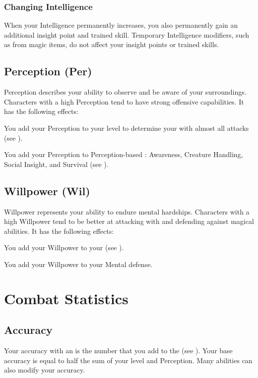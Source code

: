     \subsubsection{Changing Intelligence}\label{Changing Intelligence}
      When your Intelligence permanently increases, you also permanently gain an additional insight point and trained skill.
      Temporary Intelligence modifiers, such as from magic items, do not affect your insight points or trained skills.

  \subsection{Perception (Per)}\label{Perception}
    {
      Perception describes your ability to observe and be aware of your surroundings.
      Characters with a high Perception tend to have strong offensive capabilities.
      It has the following effects:
      \begin{raggeditemize}
        \item You add your Perception to your level to determine your  with almost all attacks (see ).
        \item You add your Perception to Perception-based : Awareness, Creature Handling, Social Insight, and Survival (see ).
      \end{raggeditemize}
    }

  \subsection{Willpower (Wil)}\label{Willpower}
    {
      Willpower represents your ability to endure mental hardships.
      Characters with a high Willpower tend to be better at attacking with and defending against magical abilities.
      It has the following effects:
      \begin{raggeditemize}
        \item You add your Willpower to your  (see ).
        \item You add your Willpower to your Mental defense.
      \end{raggeditemize}
    }

\section{Combat Statistics}\label{Combat Statistics}

  \subsection{Accuracy}\label{Accuracy}
    Your accuracy with an  is the number that you add to the  (see ).
    Your base accuracy is equal to half the sum of your level and Perception.
    Many abilities can also modify your accuracy.

